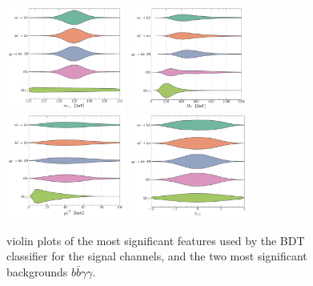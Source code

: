 \begin{figure}[htpb!]
	\centering
	\includegraphics[width=0.35\textwidth]{fig/shape-MAA} 	\hspace*{0.25 cm}
	\includegraphics[width=0.35\textwidth]{fig/shape-HT}  \\
	\includegraphics[width=0.35\textwidth]{fig/shape-PTA2} \hspace*{0.25 cm}
	\includegraphics[width=0.35\textwidth]{fig/shape-ETAa1} 
	\caption{violin plots of the most significant features used by the BDT classifier for the signal channels, and the two most significant backgrounds $ b \bar b \gamma \gamma$. }
	\label{fig:voilen}
\end{figure}  
